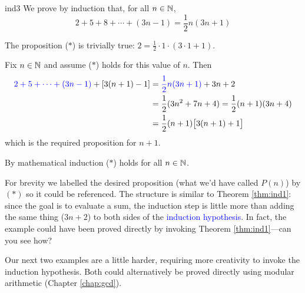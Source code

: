\begin{example}{}{ind3}
	We prove by induction that, for all $n\in\mathbb{N}$,
	\[
		2+5+8+\cdots+(3n-1)=\frac 12n(3n+1) \tag{$\ast$}
	\]
	\begin{description}\itemsep0pt
		\item[\normalfont\emph{Base case} ($n=1$):] The proposition ($\ast$) is trivially true: $2=\frac 12\cdot 1\cdot(3\cdot 1+1)$.
		\item[\normalfont\emph{Induction Step}:] Fix $n\in\mathbb{N}$ and assume ($\ast$) holds for this value of $n$. Then
		\begin{align*}
			\textcolor{blue}{2+5+\cdots+(3n-1)}+[3(n+1)-1]&=\textcolor{blue}{\frac 12n(3n+1)}+3n+2\\
			&=\frac 12(3n^2+7n+4) =\frac 12(n+1)(3n+4)\\
			&=\frac 12(n+1)\bigl[3(n+1)+1\bigr]
		\end{align*}
		which is the required proposition for $n+1$.
	\end{description}
	By mathematical induction ($\ast$) holds for all $n\in\mathbb{N}$.
\end{example}

For brevity we labelled the desired proposition (what we'd have called $P(n)$) by $(\ast)$ so it could be referenced. The structure is similar to Theorem \ref{thm:ind1}: since the goal is to evaluate a sum, the induction step is little more than adding the same thing ($3n+2$) to both sides of the \textcolor{blue}{induction hypothesis}. In fact, the example could have been proved directly by invoking Theorem \ref{thm:ind1}---can you see how?
\medbreak\goodbreak

Our next two examples are a little harder, requiring more creativity to invoke the induction hypothesis. Both could alternatively be proved directly using modular arithmetic (Chapter \ref{chap:gcd}).

